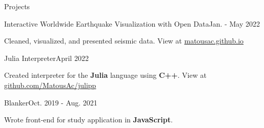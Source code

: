 \begin{rSection}{Projects}
	\begin{job}{Interactive Worldwide Earthquake Visualization with Open Data}{Jan. - May 2022}{}{}
		\item Cleaned, visualized, and presented seismic data. View at \href{https://matousac.github.io/}{matousac.github.io}
	\end{job}
	\begin{job}{Julia Interpreter}{April 2022}{}{}
		\item Created interpreter for the {\bf Julia} language using {\bf C++}. View at \href{https://github.com/MatousAc/julipp}{github.com/MatousAc/julipp}
	\end{job}
	\begin{job}{Blanker}{Oct. 2019 - Aug. 2021}{}{}
		\item Wrote front-end for study application in {\bf JavaScript}.
	\end{job}
\end{rSection}